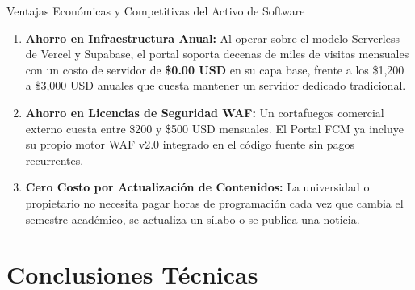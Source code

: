 \documentclass[12pt,a4paper,oneside]{report}
\begin{document}
\begin{cajaSeguridad}{Ventajas Económicas y Competitivas del Activo de Software}
\begin{enumerate}[label=\textbf{\arabic*.}, leftmargin=0.8cm, itemsep=3pt]
  \item \textbf{Ahorro en Infraestructura Anual:} Al operar sobre el modelo Serverless de Vercel y Supabase, el portal soporta decenas de miles de visitas mensuales con un costo de servidor de \textbf{\$0.00 USD} en su capa base, frente a los \$1,200 a \$3,000 USD anuales que cuesta mantener un servidor dedicado tradicional.
  \item \textbf{Ahorro en Licencias de Seguridad WAF:} Un cortafuegos comercial externo cuesta entre \$200 y \$500 USD mensuales. El Portal FCM ya incluye su propio motor WAF v2.0 integrado en el código fuente sin pagos recurrentes.
  \item \textbf{Cero Costo por Actualización de Contenidos:} La universidad o propietario no necesita pagar horas de programación cada vez que cambia el semestre académico, se actualiza un sílabo o se publica una noticia.
\end{enumerate}
\end{cajaSeguridad}

\chapter{Conclusiones Técnicas}
\end{document}
